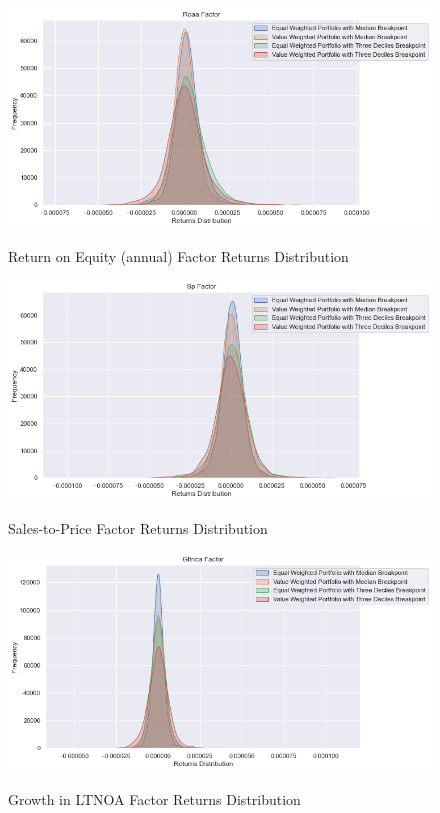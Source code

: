 \begin{figure}[H]
	\caption{Return on Equity (annual) Factor Returns Distribution}
	\centering
	\includegraphics[scale=.63]{../../output/figures/roea.png}
	\label{fig:roea}
\end{figure}

\begin{figure}[H]
	\caption{Sales-to-Price Factor Returns Distribution}
	\centering
	\includegraphics[scale=.63]{../../output/figures/sp.png}
	\label{fig:sp}
\end{figure}

\begin{figure}[H]
	\caption{Growth in LTNOA Factor Returns Distribution}
	\centering
	\includegraphics[scale=.63]{../../output/figures/gltnoa.png}
	\label{fig:gltnoa}
\end{figure}

